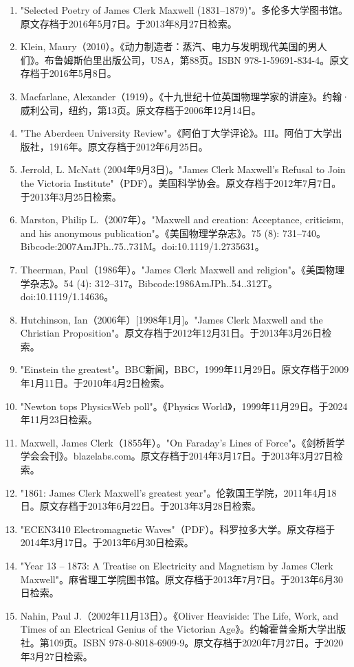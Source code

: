 \begin{enumerate}
\item "Selected Poetry of James Clerk Maxwell (1831–1879)"。多伦多大学图书馆。原文存档于2016年5月7日。于2013年8月27日检索。  
\item Klein, Maury（2010）。《动力制造者：蒸汽、电力与发明现代美国的男人们》。布鲁姆斯伯里出版公司，USA，第88页。ISBN 978-1-59691-834-4。原文存档于2016年5月8日。  
\item Macfarlane, Alexander（1919）。《十九世纪十位英国物理学家的讲座》。约翰·威利公司，纽约，第13页。原文存档于2006年12月14日。  
\item "The Aberdeen University Review"。《阿伯丁大学评论》。III。阿伯丁大学出版社，1916年。原文存档于2012年6月25日。
\item Jerrold, L. McNatt (2004年9月3日)。"James Clerk Maxwell's Refusal to Join the Victoria Institute"（PDF）。美国科学协会。原文存档于2012年7月7日。于2013年3月25日检索。  
\item Marston, Philip L.（2007年）。"Maxwell and creation: Acceptance, criticism, and his anonymous publication"。《美国物理学杂志》。75 (8): 731–740。Bibcode:2007AmJPh..75..731M。doi:10.1119/1.2735631。  
\item Theerman, Paul（1986年）。"James Clerk Maxwell and religion"。《美国物理学杂志》。54 (4): 312–317。Bibcode:1986AmJPh..54..312T。doi:10.1119/1.14636。  
\item Hutchinson, Ian（2006年）[1998年1月]。"James Clerk Maxwell and the Christian Proposition"。原文存档于2012年12月31日。于2013年3月26日检索。  
\item "Einstein the greatest"。BBC新闻，BBC，1999年11月29日。原文存档于2009年1月11日。于2010年4月2日检索。  
\item "Newton tops PhysicsWeb poll"。《Physics World》，1999年11月29日。于2024年11月23日检索。  
\item Maxwell, James Clerk（1855年）。"On Faraday's Lines of Force"。《剑桥哲学学会会刊》。blazelabs.com。原文存档于2014年3月17日。于2013年3月27日检索。
\item "1861: James Clerk Maxwell's greatest year"。伦敦国王学院，2011年4月18日。原文存档于2013年6月22日。于2013年3月28日检索。  
\item "ECEN3410 Electromagnetic Waves"（PDF）。科罗拉多大学。原文存档于2014年3月17日。于2013年6月30日检索。  
\item "Year 13 – 1873: A Treatise on Electricity and Magnetism by James Clerk Maxwell"。麻省理工学院图书馆。原文存档于2013年7月7日。于2013年6月30日检索。  
\item Nahin, Paul J.（2002年11月13日）。《Oliver Heaviside: The Life, Work, and Times of an Electrical Genius of the Victorian Age》。约翰霍普金斯大学出版社。第109页。ISBN 978-0-8018-6909-9。原文存档于2020年7月27日。于2020年3月27日检索。  

\end{enumerate}
